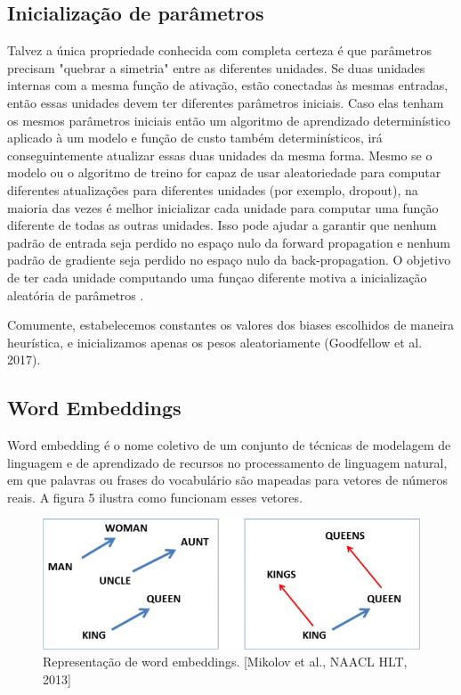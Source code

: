 \documentclass[12pt]{article}
\begin{document}
\subsection{Inicialização de parâmetros}

Talvez a única propriedade conhecida com completa certeza é que parâmetros precisam "quebrar a simetria" entre as diferentes unidades. Se duas unidades internas com a mesma função de ativação, estão conectadas às mesmas entradas, então essas unidades devem ter diferentes parâmetros iniciais. Caso elas tenham os mesmos parâmetros iniciais então um algoritmo de aprendizado determinístico aplicado à um modelo e função de custo também determinísticos, irá conseguintemente atualizar essas duas unidades da mesma forma. Mesmo se o modelo ou o algoritmo de treino for capaz de usar aleatoriedade para computar diferentes atualizações para diferentes unidades (por exemplo, dropout), na maioria das vezes é melhor inicializar cada unidade para computar uma função diferente de todas as outras unidades. Isso pode ajudar a garantir que nenhum padrão de entrada seja perdido no espaço nulo da forward propagation e nenhum padrão de gradiente seja perdido no espaço nulo da back-propagation. O objetivo de ter cada unidade computando uma funçao diferente motiva a inicialização aleatória de parâmetros \cite{Goodfellow-et-al-2016}.

Comumente, estabelecemos constantes os valores dos biases escolhidos de maneira heurística, e inicializamos apenas os pesos aleatoriamente (Goodfellow et al. 2017).

\subsection{Word Embeddings}

Word embedding é o nome coletivo de um conjunto de técnicas de modelagem de linguagem e de aprendizado de recursos no processamento de linguagem natural, em que palavras ou frases do vocabulário são mapeadas para vetores de números reais. A figura 5 ilustra como funcionam esses vetores.
\begin{figure}
  \centering
  \includegraphics[width=1\textwidth]{images/wordembeddings.png}
  \caption{
    Representação de word embeddings. [Mikolov et al., NAACL HLT, 2013]
  }
  \label{}
\end{figure}
\end{document}

